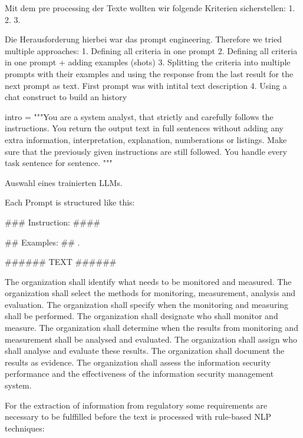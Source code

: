 Mit dem pre processing der Texte wollten wir folgende Kriterien sicherstellen:
1. 
2.
3.

Die Herausforderung hierbei war das prompt engineering. Therefore we tried multiple approaches:
1. Defining all criteria in one prompt 
2. Defining all criteria in one prompt + adding examples (shots)
3. Splitting the criteria into multiple prompts with their examples and using the response from the last result for the next prompt as text. First prompt was with intital text description 
4. Using a chat construct to build an history

intro = """You are a system analyst, that strictly and carefully follows the instructions. 
        You return the output text in full sentences without adding any extra information, interpretation, explanation, numberations or listings. 
        Make sure that the previously given instructions are still followed.
        You handle every task sentence for sentence. \n"""


Auswahl eines trainierten LLMs.

Each Prompt is structured like this:

### Instruction: #### \n
     
## Examples: ## . \n
            
###### TEXT ###### \n


The organization shall identify what needs to be monitored and measured. The organization shall select the methods for monitoring, measurement, analysis and evaluation. The organization shall specify when the monitoring and measuring shall be performed. The organization shall designate who shall monitor and measure. The organization shall determine when the results from monitoring and measurement shall be analysed and evaluated. The organization shall assign who shall analyse and evaluate these results. The organization shall document the results as evidence. The organization shall assess the information security performance and the effectiveness of the information security management system.


For the extraction of information from regulatory some requirements are necessary to be fulffilled before the text is processed with rule-based NLP techniques:



